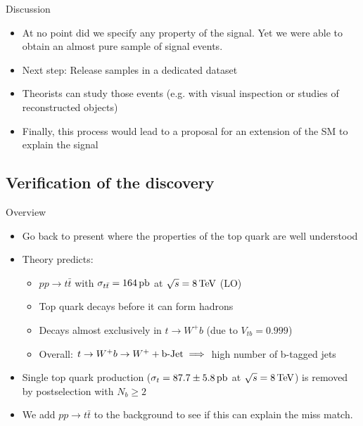 \documentclass{beamer}
\begin{document}
\begin{frame}{Discussion}
\begin{itemize}
    \item<1-> At no point did we specify any property of the signal. Yet we were able to obtain an almost pure sample of signal events.
    \item<2-> Next step: Release samples in a dedicated dataset
    \item<3-> Theorists can study those events (e.g. with visual inspection or studies of reconstructed objects)
    \item<4-> Finally, this process would lead to a proposal for an extension of the SM to explain the signal
\end{itemize}
\end{frame}

\subsection{Verification of the discovery}
\begin{frame}{Overview}
\begin{itemize}
    \item<1-> Go back to present where the properties of the top quark are well understood
    \item<2-> Theory predicts:
    \begin{itemize}
        \item<3-> $pp \rightarrow t\bar{t}$ with $\sigma_{t\bar{t}}=164\,\textup{pb}$ at $\sqrt{s}=8\,\textup{TeV}$ (LO)
        \item<4-> Top quark decays before it can form hadrons
        \item<5-> Decays almost exclusively in $t \rightarrow W^+ b$ (due to $V_{tb}=0.999$)
        \item Overall: $t \rightarrow W^+ b \rightarrow W^+ + \textup{b-Jet} \implies$ high number of b-tagged jets 
    \end{itemize}
    
    \item<6-> Single top quark production ($\sigma_{t}=87.7 \pm 5.8 \, \textup{pb}$ at $\sqrt{s}=8\,\textup{TeV}$) is removed by postselection with $N_b\geq 2$
    
    \item<7-> We add $pp \rightarrow t\bar{t}$ to the background to see if this can explain the miss match.
\end{itemize}
\end{frame}
\end{document}
